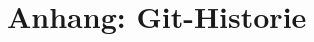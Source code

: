 \documentclass[usegeometry=true]{scrartcl}
\begin{document}

\tableofcontents
\clearpage















\clearpage
\printbibliography

\section*{Anhang: Git-Historie}
\end{document}
